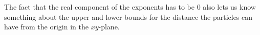 The fact that the real component of the exponents has to be $0$ also lets us know something about the upper and lower bounds for the distance the particles can have from the origin in the $xy$-plane. 


